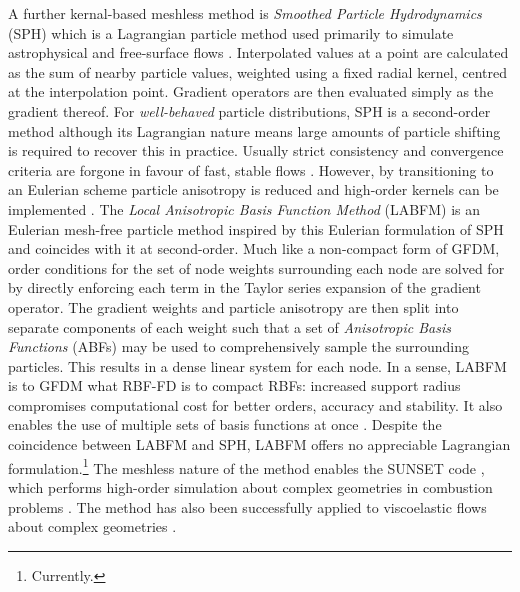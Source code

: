 A further kernal-based meshless method is \emph{Smoothed Particle Hydrodynamics} (SPH) which is a Lagrangian particle method used primarily to simulate astrophysical and free-surface flows \cite{monaghan1992SmoothedParticleHydrodynamics, lind2020ReviewSmoothedParticle}. Interpolated values at a point are calculated as the sum of nearby particle values, weighted using a fixed radial kernel, centred at the interpolation point. Gradient operators are then evaluated simply as the gradient thereof. For \emph{well-behaved} particle distributions, SPH is a second-order method although its Lagrangian nature means large amounts of particle shifting is required to recover this in practice. Usually strict consistency and convergence criteria are forgone in favour of fast, stable flows \cite{vacondio2021GrandChallengesSmoothed}. However, by transitioning to an Eulerian scheme particle anisotropy is reduced and high-order kernels can be implemented \cite{lind2016HighorderEulerianIncompressible}. The \emph{Local Anisotropic Basis Function Method} (LABFM) is an Eulerian mesh-free particle method inspired by this Eulerian formulation of SPH and coincides with it at second-order. Much like a non-compact form of GFDM, order conditions for the set of node weights surrounding each node are solved for by directly enforcing each term in the Taylor series expansion of the gradient operator. The gradient weights and particle anisotropy are then split into separate components of each weight such that a set of \emph{Anisotropic Basis Functions} (ABFs) may be used to comprehensively sample the surrounding particles. This results in a dense linear system for each node. In a sense, LABFM is to GFDM what RBF-FD is to compact RBFs: increased support radius compromises computational cost for better orders, accuracy and stability. It also enables the use of multiple sets of basis functions at once . Despite the coincidence between LABFM and SPH, LABFM offers no appreciable Lagrangian formulation.\footnote{Currently.} The meshless nature of the method enables the SUNSET code \cite{kingSunsetFlames}, which performs high-order simulation about complex geometries \cite{king2022HighOrderSimulationsIsothermal} in combustion problems \cite{king2024MeshFreeFrameworkHighOrdera, broadley2025HighorderMeshfreeDirect}. The method has also been successfully applied to viscoelastic flows about complex geometries \cite{king2024MeshFreeFrameworkHighOrder}.





